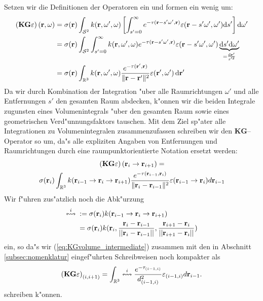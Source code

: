 \documentclass[11pt,a4paper,DIVcalc,BCOR8mm,titlepage,twoside]{scrartcl}
\begin{document}
	Setzen wir die Definitionen der Operatoren ein und formen ein wenig um:
	\begin{align*}
		\left(\mathbf{KG}\varepsilon\right)(\mathbf{r},\omega)&=\sigma(\mathbf{r}) \int_{\mathcal{S}^2} k(\mathbf{r},\omega',\omega)\left[\int_{s'=0}^\infty e^{-\tau(\mathbf{r}-s' \omega',\mathbf{r})}\varepsilon(\mathbf{r}-s' \omega',\omega') \text{d}s'\right] \text{d}\omega' \\
		&=\sigma(\mathbf{r}) \int_{\mathcal{S}^2} \int_{s'=0}^\infty k(\mathbf{r},\omega',\omega) e^{-\tau(\mathbf{r}-s' \omega',\mathbf{r})}\varepsilon(\mathbf{r}-s' \omega',\omega') \underbrace{\text{d}s' \text{d}\omega'}_{=\frac{\text{d}\mathbf{r}'}{s'^2}} \\
		&=\sigma(\mathbf{r}) \int_{\mathbb{R}^3} k(\mathbf{r},\omega',\omega) \frac{e^{-\tau(\mathbf{r}',\mathbf{r})}}{\|\mathbf{r}-\mathbf{r}'\|^2}\varepsilon(\mathbf{r}',\omega') \,\text{d}\mathbf{r}'
	\end{align*}
	Da wir durch Kombination der Integration "uber alle Raumrichtungen $\omega'$ und alle Entfernungen $s'$ den gesamten Raum abdecken, k"onnen wir die beiden Integrale zugunsten eines Volumenintegrals "uber den gesamten Raum sowie eines geometrischen Verd"unnungsfaktors tauschen. Mit dem Ziel sp"ater alle Integrationen zu Volumenintegralen zusammenzufassen schreiben wir den $\mathbf{KG}$--Operator so um, da"s alle expliziten Angaben von Entfernungen und Raumrichtungen durch eine raumpunktorientierte Notation ersetzt werden:
	\begin{multline}
		\left(\mathbf{KG}\varepsilon\right)(\mathbf{r}_i \rightarrow\mathbf{r}_{i+1})=\\
		\sigma(\mathbf{r}_i) \int_{\mathbb{R}^3} k(\mathbf{r}_{i-1}\rightarrow\mathbf{r}_i\rightarrow\mathbf{r}_{i+1})\frac{e^{-\tau(\mathbf{r}_{i-1},\mathbf{r}_i)}}{\|\mathbf{r}_i-\mathbf{r}_{i-1}\|^2}\varepsilon(\mathbf{r}_{i-1} \rightarrow\mathbf{r}_i)d\mathbf{r}_{i-1}
		\label{eq:KGvolume_intermediate}
	\end{multline}
	Wir f"uhren zus"atzlich noch die Abk"urzung
	\begin{align*}
		\overset{i}{\leftrightsquigarrow}\;&:=\sigma(\mathbf{r}_i)k(\mathbf{r}_{i-1}\rightarrow\mathbf{r}_i\rightarrow\mathbf{r}_{i+1})\\
			&=\sigma(\mathbf{r}_i)k(\mathbf{r}_i,\frac{\mathbf{r}_i-\mathbf{r}_{i-1}}{||\mathbf{r}_i-\mathbf{r}_{i-1}||},\frac{\mathbf{r}_{i+1}-\mathbf{r}_i}{||\mathbf{r}_{i+1}-\mathbf{r}_i||})
	\end{align*}
	ein, so da"s wir (\ref{eq:KGvolume_intermediate}) zusammen mit den in Abschnitt \ref{subsec:nomenklatur} eingef"uhrten Schreibweisen noch kompakter als
	\begin{equation}
		\left(\mathbf{KG}\varepsilon\right)_{(i,i+1)}=\int_{\mathbb{R}^3} \overset{i}{\leftrightsquigarrow}\frac{e^{-\tau_{(i-1,i)}}}{d_{(i-1,i)}^2}\varepsilon_{(i-1,i)}d\mathbf{r}_{i-1}.
		\label{eq:KGvolume}
	\end{equation}
	schreiben k"onnen.
\end{document}
